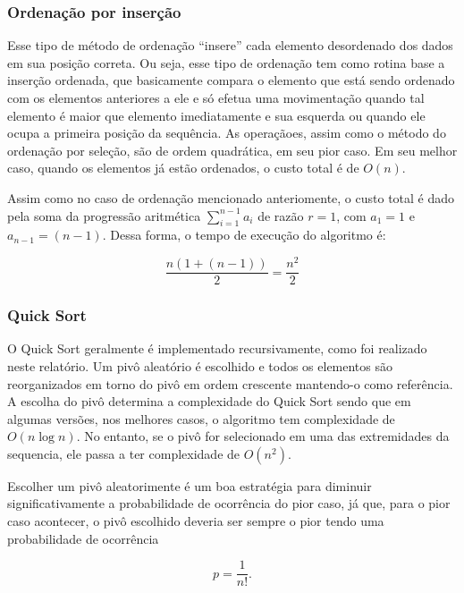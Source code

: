 \documentclass[
]{article}
\begin{document}
\hypertarget{ordenauxe7uxe3o-por-inseruxe7uxe3o}{%
\subsubsection{Ordenação por
inserção}\label{ordenauxe7uxe3o-por-inseruxe7uxe3o}}

Esse tipo de método de ordenação ``insere'' cada elemento desordenado
dos dados em sua posição correta. Ou seja, esse tipo de ordenação tem
como rotina base a inserção ordenada, que basicamente compara o elemento
que está sendo ordenado com os elementos anteriores a ele e só efetua
uma movimentação quando tal elemento é maior que elemento imediatamente
e sua esquerda ou quando ele ocupa a primeira posição da sequência. As
operaçãoes, assim como o método do ordenação por seleção, são de ordem
quadrática, em seu pior caso. Em seu melhor caso, quando os elementos já
estão ordenados, o custo total é de \(O(n)\).

Assim como no caso de ordenação mencionado anteriomente, o custo total é
dado pela soma da progressão aritmética
\(\sum\limits_{i = 1}^{n-1} a_i\) de razão \(r = 1\), com \(a_1 = 1\) e
\(a_{n-1} = (n-1)\). Dessa forma, o tempo de execução do algoritmo é:

\begin{equation}
  \frac{n(1+(n-1))}{2} = \frac{n^2}{2}
\end{equation}

\hypertarget{quick-sort}{%
\subsubsection{Quick Sort}\label{quick-sort}}

O Quick Sort geralmente é implementado recursivamente, como foi
realizado neste relatório. Um pivô aleatório é escolhido e todos os
elementos são reorganizados em torno do pivô em ordem crescente
mantendo-o como referência. A escolha do pivô determina a complexidade
do Quick Sort sendo que em algumas versões, nos melhores casos, o
algoritmo tem complexidade de \(O(n \log n)\). No entanto, se o pivô for
selecionado em uma das extremidades da sequencia, ele passa a ter
complexidade de \(O(n^2)\).

Escolher um pivô aleatorimente é um boa estratégia para diminuir
significativamente a probabilidade de ocorrência do pior caso, já que,
para o pior caso acontecer, o pivô escolhido deveria ser sempre o pior
tendo uma probabilidade de ocorrência

\begin{equation}
  p = \frac{1}{n!}.
\end{equation}
\end{document}
